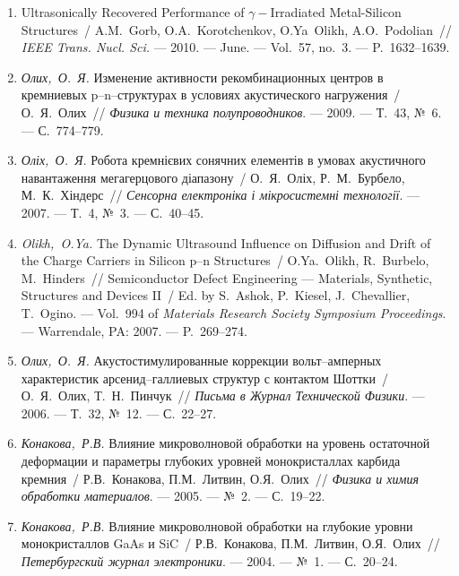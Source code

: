 \begin{enumerate}[label=\arabic*.,leftmargin=1em,itemindent=1em]
\item
Ultrasonically Recovered Performance of $\gamma-$Irradiated Metal-Silicon
  Structures~/ A.M.~Gorb, O.A.~Korotchenkov, O.Ya~Olikh, A.O.~Podolian~//
  \emph{IEEE Trans. Nucl. Sci.} ---
  2010. --- June. ---
  Vol.~57, no.~3. ---
  P.~1632--1639.

\item
\emph{Олих,~О.~Я.} Изменение активности
  рекомбинационных центров в кремниевых
  p--n--структурах в условиях акустического
  нагружения~/ О.~Я.~Олих~// \emph{Физика и
  техника полупроводников}. ---
  2009. ---
  Т.~43, {№}~6. ---
  {С.}~774--779.

\item
\emph{Оліх,~О.~Я.} Робота кремнієвих сонячних
  елементів в умовах акустичного
  навантаження мегагерцового діапазону~/
  О.~Я.~Оліх, Р.~М.~Бурбело, М.~К.~Хіндерс~//
  \emph{Сенсорна електроніка і
  мікросистемні технології}. ---
  2007. ---
  Т.~4, {№}~3. ---
  {С.}~40--45.

\item
\emph{Olikh,~O.Ya.} The Dynamic Ultrasound Influence on Diffusion and Drift
  of the Charge Carriers in Silicon p--n Structures~/ O.Ya.~Olikh, R.~Burbelo,
  M.~Hinders~// Semiconductor Defect Engineering --- Materials, Synthetic,
  Structures and Devices II~/ Ed. by S.~Ashok, P.~Kiesel, J.~Chevallier,
  T.~Ogino. ---
  Vol.~994 of \emph{Materials Research Society Symposium
  Proceedings}. ---
  Warrendale, PA: 2007. ---
  P.~269--274.

\item
\emph{Олих,~О.~Я.} Акустостимулированные
  коррекции вольт--амперных характеристик
  арсенид--галлиевых структур с контактом
  {Ш}оттки~/ О.~Я.~Олих, Т.~Н.~Пинчук~//
  \emph{Письма в Журнал Технической Физики}.
  ---
  2006. ---
  Т.~32, {№}~12. ---
  {С.}~22--27.

\item
\emph{Конакова,~Р.В.} Влияние микроволновой
  обработки на уровень остаточной
  деформации и параметры глубоких уровней
  монокристаллах карбида кремния~/
  Р.В.~Конакова, П.М.~Литвин, О.Я.~Олих~//
  \emph{Физика и химия обработки материалов}.
  ---
  2005. ---
  {№}~2. ---
  {С.}~19--22.


\item
\emph{Конакова,~Р.В.} Влияние микроволновой
  обработки на глубокие уровни
  монокристаллов {G}a{A}s и {S}i{C}~/ Р.В.~Конакова,
  П.М.~Литвин, О.Я.~Олих~// \emph{Петербургский
  журнал электроники}. ---
  2004. ---
  {№}~1. ---
  {С.}~20--24.


\end{enumerate}
